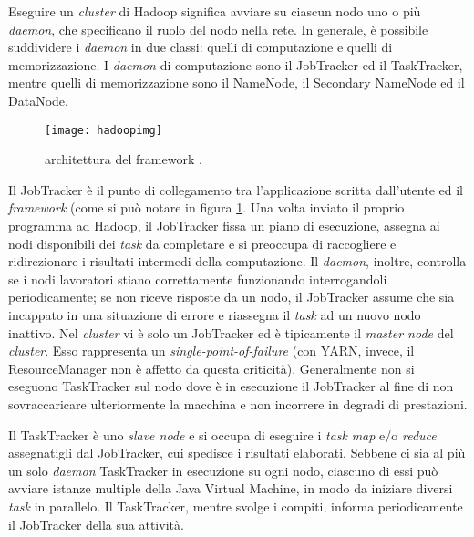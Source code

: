 Eseguire un \textit{cluster} di Hadoop significa avviare su ciascun nodo uno o più \textit{daemon}, che specificano il ruolo del nodo nella rete. In generale, è possibile suddividere i \textit{daemon} in 
due classi: quelli di computazione e quelli di memorizzazione. I \textit{daemon} di computazione sono il JobTracker ed il TaskTracker, mentre quelli di memorizzazione sono il NameNode, 
il Secondary NameNode ed il DataNode.

\begin{figure}[ht]
\centering
\texttt{[image: hadoopimg]}
\caption{architettura del framework \cite{hadoop}.}
\label{hadoopclient}
\end{figure}

Il JobTracker è il punto di collegamento tra l’applicazione scritta dall’utente ed il \textit{framework} (come si può notare in figura \ref{hadoopclient}. Una volta inviato il proprio programma ad Hadoop, il JobTracker fissa un piano 
di esecuzione, assegna ai nodi disponibili dei \textit{task} da completare e si preoccupa di raccogliere e ridirezionare i risultati intermedi della computazione. Il \textit{daemon}, inoltre, 
controlla se i nodi lavoratori stiano correttamente funzionando interrogandoli periodicamente; se non riceve risposte da un nodo, il JobTracker assume che sia incappato in una 
situazione di errore e riassegna il \textit{task} ad un nuovo nodo inattivo. Nel \textit{cluster} vi è solo un JobTracker ed è tipicamente il \textit{master node} del \textit{cluster}. Esso rappresenta un 
\textit{single-point-of-failure} (con YARN, invece, il ResourceManager non è affetto da questa criticità). Generalmente non si eseguono TaskTracker sul nodo dove è in esecuzione il 
JobTracker al fine di non sovraccaricare ulteriormente la macchina e non incorrere in degradi di prestazioni.

Il TaskTracker è uno \textit{slave node} e si occupa di eseguire i \textit{task} \textit{map} e/o \textit{reduce} assegnatigli dal JobTracker, cui spedisce i risultati elaborati. Sebbene ci sia al più un solo 
\textit{daemon} TaskTracker in esecuzione su ogni nodo, ciascuno di essi può avviare istanze multiple della Java Virtual Machine, in modo da iniziare diversi \textit{task} in parallelo. Il 
TaskTracker, mentre svolge i compiti, informa periodicamente il JobTracker della sua attività.

